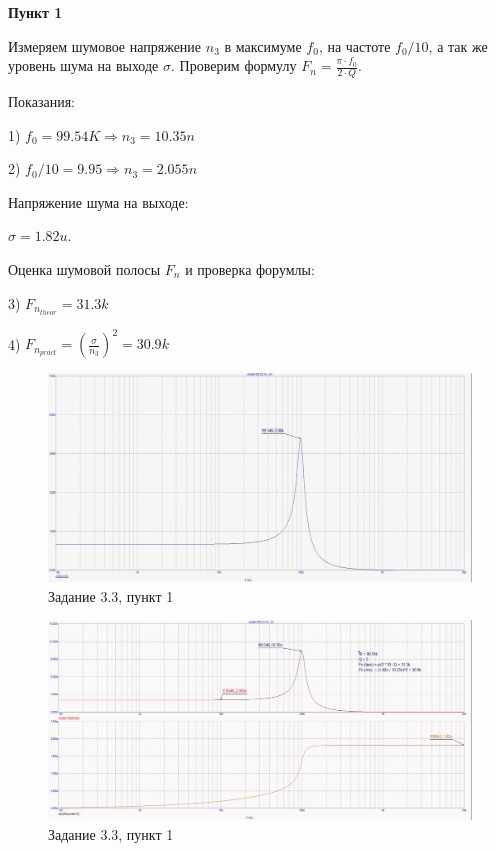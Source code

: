 \documentclass[a4paper, 14pt]{extarticle}%
\begin{document}
\textbf{Пункт 1}


Измеряем шумовое напряжение $n_3$ в максимуме $f_0$, на частоте $f_0/10$, а так же уровень шума на выходе $\sigma$.
Проверим формулу $F_n = \frac{\pi\cdot f_0}{2\cdot Q}$.

Показания:

1) $f_0 = 99.54K \Rightarrow n_3 = 10.35n$

2) $f_0/10 = 9.95 \Rightarrow n_3 = 2.055n$

Напряжение шума на выходе:

$\sigma = 1.82u$.

Оценка шумовой полосы $F_n$ и проверка форумлы:

3) $F_{n_{theor}} = 31.3k$

4) $F_{n_{pract}} = (\frac{\sigma}{n_3})^{2} = 30.9k$

\begin{figure}[h!]
			\centering
			\includegraphics[width=1.1\linewidth]{3/3_3_1.jpg}
			\caption{Задание 3.3, пункт 1}
			\label{A}
\end{figure}



\begin{figure}[h!]
			\centering
			\includegraphics[width=1.1\linewidth]{3/3_3_2.jpg}
			\caption{Задание 3.3, пункт 1}
			\label{A}
\end{figure}
\end{document}
